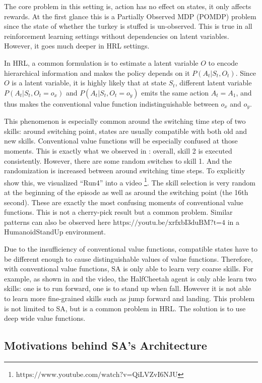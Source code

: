 The core problem in this setting is, action has no effect on
states, it only affects rewards. At the first glance this is a
Partially Observed MDP (POMDP) problem since the state of whether
the turkey is stuffed is un-observed. This is true in all
reinforcement learning settings without dependencies on latent
variables. However, it goes much deeper in HRL settings.

In HRL, a common formulation is to estimate a latent variable $O$
to encode hierarchical information and makes the policy depends
on it $P(A_t|S_t,O_t)$. Since $O$ is a latent variable, it is
highly likely that at state $S_t$, different latent variable
$P(A_t|S_t,O_t=o_x)$ and $P(A_t|S_t,O_t=o_y)$ emits the same
action $A_t=A_1$, and thus makes the conventional value function
indistinguishable between $o_x$ and $o_y$.

This phenomenon is especially common around the switching time
step of two skills: around switching point, states are usually
compatible with both old and new skills. Conventional value
functions will be especially confused at those moments. This is
exactly what we observed in : overall, skill
2 is executed consistently. However, there are some random
switches to skill 1. And the randomization is increased between
around switching time steps. To explicitly show this, we
visualized ``Run4'' into a video
\footnote{$\text{https://www.youtube.com/watch?v=QiLVZvI6NJU}$}.
The skill selection is very random at the beginning of the
episode as well as around the switching point (the 16th second).
These are exactly the most confusing moments of conventional
value functions. This is not a cherry-pick result but a common
problem. Similar patterns can also be observed here
$\text{https://youtu.be/xrfxbI3duBM?t=4}$ in a HumanoidStandUp
environment.

Due to the insufficiency of conventional value functions,
compatible states have to be different enough to cause
distinguishable values of value functions. Therefore, with
conventional value functions, SA is only able to learn very
coarse skills. For example, as shown in 
and the video, the HalfCheetah agent is only able learn two
skills: one is to run forward, one is to stand up when fall.
However it is not able to learn more fine-grained skills such as
jump forward and landing. This problem is not limited to SA, but
is a common problem in HRL. The solution is to use deep wide
value functions.

\subsection{Motivations behind SA's Architecture}
\label{sec:append_dwsa}

